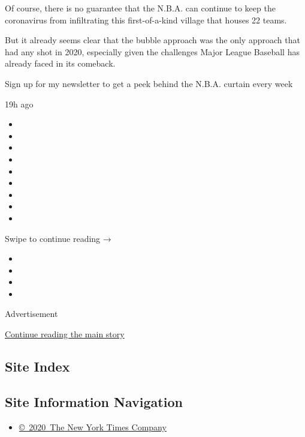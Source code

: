 Of course, there is no guarantee that the N.B.A. can continue to keep
the coronavirus from infiltrating this first-of-a-kind village that
houses 22 teams.

But it already seems clear that the bubble approach was the only
approach that had any shot in 2020, especially given the challenges
Major League Baseball has already faced in its comeback.

\href{https://www.nytimes.com/newsletters/signup/MSB}{}

Sign up for my newsletter to get a peek behind the N.B.A. curtain every
week

19h ago

\begin{itemize}
\item
\item
\item
\item
\item
\item
\item
\item
\item
\end{itemize}

Swipe to continue reading →

\begin{itemize}
\item
\item
\item
\item
\end{itemize}

Advertisement

\protect\hyperlink{after-bottom}{Continue reading the main story}

\hypertarget{site-index}{%
\subsection{Site Index}\label{site-index}}

\hypertarget{site-information-navigation}{%
\subsection{Site Information
Navigation}\label{site-information-navigation}}

\begin{itemize}
\tightlist
\item
  \href{https://help.nytimes.com/hc/en-us/articles/115014792127-Copyright-notice}{©~2020~The
  New York Times Company}
\end{itemize}


